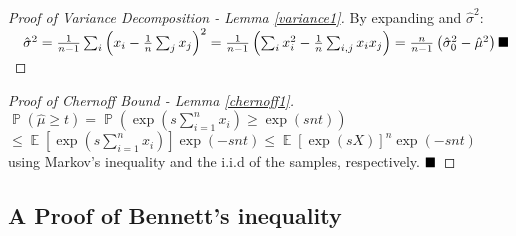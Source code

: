 \documentclass[runningheads, envcountsame, a4paper]{llncs}
\DeclareMathOperator{\E}{\mathbb{E}}
\DeclareMathOperator{\p}{\mathbb{P}}
\begin{document}
\begin{proof}[Proof of Variance Decomposition - Lemma \ref{variance1}]By expanding and $\hat{\sigma}^2$:\\
\(\quad\hat{\sigma}^2=\frac{1}{n-1}\sum_i\left(x_i-\frac{1}{n}\sum_jx_j \right)^2 
=\frac{1}{n-1}\left(\sum_ix_i^2-\frac{1}{n}\sum_{i,j}x_ix_j \right) = \frac{n}{n-1}\left(\hat{\sigma}_0^2-\hat{\mu}^2\right)\hfill\blacksquare\)
\end{proof}

\begin{proof}[Proof of Chernoff Bound - Lemma \ref{chernoff1}]\\
$\p(\hat{\mu}\ge t) =  \p\left(\exp\left(s\sum_{i=1}^nx_i\right)\ge \exp(snt)\right)$\\
\-\hspace{8mm}$\le \E\left[\exp\left(s\sum_{i=1}^nx_i\right)\right]\exp(-snt) \le \E\left[\exp\left(sX\right)\right]^n\exp(-snt)
$\\
using Markov's inequality and the i.i.d of the samples, respectively.
$\hfill\blacksquare$
\end{proof}



\subsection{A Proof of Bennett's inequality}\label{appendix:A}
\end{document}

